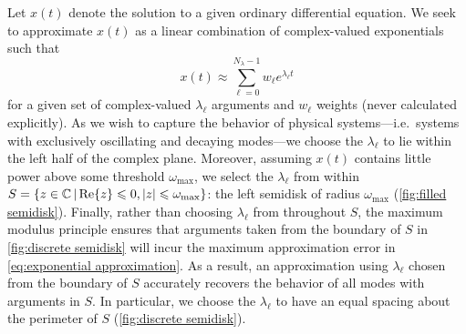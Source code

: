 Let $x(t)$ denote the solution to a given ordinary differential equation.
We seek to approximate $x(t)$ as a linear combination of complex-valued exponentials such that
\begin{equation}
  x(t) \approx \sum_{\ell = 0}^{N_\lambda - 1} w_\ell e^{\lambda_\ell t}
  \label{eq:exponential approximation}
\end{equation}
for a given set of complex-valued $\lambda_\ell$ arguments and $w_\ell$ weights (never calculated explicitly).
As we wish to capture the behavior of physical systems---i.e.\ systems with exclusively oscillating and decaying modes---we choose the $\lambda_\ell$ to lie within the left half of the complex plane.
Moreover, assuming $x(t)$ contains little power above some threshold $\omega_\text{max}$, we select the $\lambda_\ell$ from within $S = \qty{z \in \mathbb{C} \, | \Re{z} \leqslant 0, \abs{z} \leqslant \omega_\text{max}}$: the left semidisk of radius $\omega_\text{max}$ (\cref{fig:filled semidisk}).
Finally, rather than choosing $\lambda_\ell$ from throughout $S$, the maximum modulus principle ensures that arguments taken from the boundary of $S$ in \cref{fig:discrete semidisk} will incur the maximum approximation error in \cref{eq:exponential approximation}. 
As a result, an approximation using $\lambda_\ell$ chosen from the boundary of $S$ accurately recovers the behavior of all modes with arguments in $S$.
In particular, we choose the $\lambda_\ell$ to have an equal spacing about the perimeter of $S$ (\cref{fig:discrete semidisk}).

